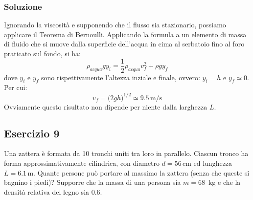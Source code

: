 \documentclass[12pt,a4paper]{book}
\begin{document}
\subsubsection*{Soluzione}
Ignorando la viscosità e supponendo che il flusso sia stazionario, possiamo applicare il Teorema di Bernoulli. Applicando la formula a un elemento di massa di fluido che si muove dalla superficie dell'acqua in cima al serbatoio fino al foro praticato sul fondo, si ha:
\begin{equation*}
\rho_{acqua} g y_i =\frac{1}{2}\rho_{acqua} v_f^2 + \rho g y_f
\end{equation*}
dove $y_i$ e $y_f$ sono rispettivamente l'altezza inziale e finale, ovvero: $y_i = h$ e $y_f \simeq 0$. Per cui:
\begin{equation*}
v_f=\big(2gh\big)^{1/2} \simeq 9.5 \, \text{m/s}
\end{equation*}
Ovviamente questo risultato non dipende per niente dalla larghezza $L$. 

\subsection*{Esercizio 9}
Una zattera è formata da 10 tronchi uniti tra loro in parallelo. Ciascun tronco ha forma approssimativamente cilindrica, con diametro $d=56\,$cm ed lunghezza $L=6.1\,$m. Quante persone può portare al massimo la zattera (senza che queste si bagnino i piedi)? Supporre che la massa di una persona sia $m=68\,$ kg e che la densità relativa del legno sia $0.6$.
\end{document}
